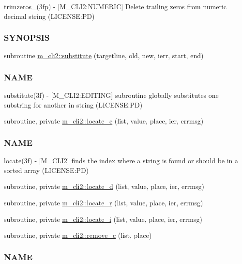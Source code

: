 \begin{DoxyCompactItemize}
\begin{DoxyCompactList}
trimzeros\+\_\+(3fp) -\/ \mbox{[}M\+\_\+\+C\+L\+I2\+:N\+U\+M\+E\+R\+IC\mbox{]} Delete trailing zeros from numeric decimal string (L\+I\+C\+E\+N\+SE\+:PD) \subsubsection*{S\+Y\+N\+O\+P\+S\+IS}\end{DoxyCompactList}\item 
subroutine \mbox{\hyperlink{namespacem__cli2_a76af7f7c39e6755e024890d85d488704}{m\+\_\+cli2\+::substitute}} (targetline, old, new, ierr, start, end)
\begin{DoxyCompactList}\small\item\em \subsubsection*{N\+A\+ME}

substitute(3f) -\/ \mbox{[}M\+\_\+\+C\+L\+I2\+:E\+D\+I\+T\+I\+NG\mbox{]} subroutine globally substitutes one substring for another in string (L\+I\+C\+E\+N\+SE\+:PD) \end{DoxyCompactList}\item 
subroutine, private \mbox{\hyperlink{namespacem__cli2_a2199778fea512efcde8778f20765643a}{m\+\_\+cli2\+::locate\+\_\+c}} (list, value, place, ier, errmsg)
\begin{DoxyCompactList}\small\item\em \subsubsection*{N\+A\+ME}

locate(3f) -\/ \mbox{[}M\+\_\+\+C\+L\+I2\mbox{]} finds the index where a string is found or should be in a sorted array (L\+I\+C\+E\+N\+SE\+:PD) \end{DoxyCompactList}\item 
subroutine, private \mbox{\hyperlink{namespacem__cli2_a0e859cd8635ab617ea9a4e9b4ffca852}{m\+\_\+cli2\+::locate\+\_\+d}} (list, value, place, ier, errmsg)
\item 
subroutine, private \mbox{\hyperlink{namespacem__cli2_a2e12eb8c0ae6ce90b821141699e627df}{m\+\_\+cli2\+::locate\+\_\+r}} (list, value, place, ier, errmsg)
\item 
subroutine, private \mbox{\hyperlink{namespacem__cli2_a3cc41a1a629f9ab278376a71b243673d}{m\+\_\+cli2\+::locate\+\_\+i}} (list, value, place, ier, errmsg)
\item 
subroutine, private \mbox{\hyperlink{namespacem__cli2_a155af513c048d68552ec2e8fb54e1294}{m\+\_\+cli2\+::remove\+\_\+c}} (list, place)
\begin{DoxyCompactList}\small\item\em \subsubsection*{N\+A\+ME}


\end{DoxyCompactList}
\end{DoxyCompactItemize}
